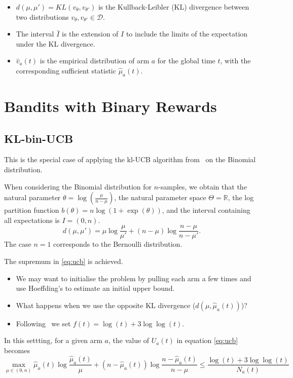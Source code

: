 \documentclass[a4paper,11pt]{article}
\newcommand{\RR}{\mathbb{R}}
\newcommand{\vhat}{\widehat{v}}
\newcommand{\muhat}{\widehat{\mu}}
\newcommand{\Dcal}{\mathcal{D}}
\begin{document}
\begin{itemize}
\item $d(\mu,\mu') = KL(v_\theta, v_{\theta'})$ is the
  Kullback-Leibler (KL) divergence between two distributions
  $v_\theta,v_{\theta'}\in\Dcal$.
\item The interval $\bar{I}$ is the extension of $I$ to include the limits of
  the expectation under the KL divergence.
\item $\vhat_a(t)$ is the empirical distribution of arm $a$ for the
  global time $t$, with the corresponding sufficient statistic
  $\muhat_a(t)$.
\end{itemize}

\section{Bandits with Binary Rewards}

\subsection{KL-bin-UCB}

This is the special case of applying the kl-UCB algorithm
from~\cite{cappe13kulucb} on the Binomial distribution.



When considering the Binomial distribution for $n$-samples, we obtain
that the natural parameter $\theta = \log\left(\frac{\mu}{n-\mu}\right)$, the natural
parameter space $\Theta = \RR$,
the log partition function $b(\theta) = n\log(1+\exp(\theta))$, and
the interval containing all expectations is $I=(0,n)$.
\[
d(\mu, \mu') = \mu \log \frac{\mu}{\mu'} + (n-\mu) \log\frac{n-\mu}{n-\mu'}.
\]
The case $n=1$ corresponds to the Bernoulli distribution.

The supremum in \eqref{eq:ucb} is achieved.

\begin{itemize}
\item We may want to initialise the problem by pulling each arm a few
  times and use Hoeffding's to estimate an initial upper bound.
\item What happens when we use the opposite KL divergence ($d(\mu, \muhat_a(t))$)?
\item Following~\cite[Theorem 1]{cappe13kulucb} we set $f(t) = \log(t)
  + 3\log\log(t)$. 
\end{itemize}

In this settting, for a given arm $a$, the value of $U_a(t)$ in equation \eqref{eq:ucb} becomes
\begin{equation}
  \label{eq:ucb-binomial}
  \max_{\mu\in (0,n)} \muhat_a(t) \log \frac{\muhat_a(t)}{\mu} +
  (n-\muhat_a(t)) \log\frac{n-\muhat_a(t)}{n-\mu} 
  \leqslant \frac{\log(t)+3\log\log(t)}{N_a(t)}
\end{equation}





\end{document}
